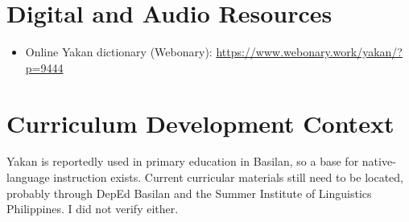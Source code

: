 \documentclass[12pt]{article}
\begin{document}
\section{Digital and Audio Resources}
\begin{itemize}
\item Online Yakan dictionary (Webonary): \url{https://www.webonary.work/yakan/?p=9444}
\end{itemize}

\section{Curriculum Development Context}
Yakan is reportedly used in primary education in Basilan, so a base for native-language instruction exists. Current curricular materials still need to be located, probably through DepEd Basilan and the Summer Institute of Linguistics Philippines. I did not verify either.
\end{document}

